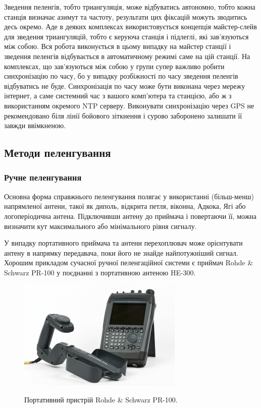 \documentclass{article}
\begin{document}
Зведення пеленгів, тобто триангуляція, може відбуватись автономно, тобто кожна станція визначає азимут та частоту, результати цих фіксацій можуть зводитись десь окремо. Аде в деяких комплексах використовується концепція майстер-слейв для зведення триангуляцій, тобто є керуюча станція і підлеглі, які зав'язуються між собою. Вся робота виконується в цьому випадку на майстер станції і зведення пеленгів відбувається в автоматичному режимі саме на цій станції. На комплексах, що зав'язуються між собою у групи супер важливо робити синхронізацію по часу, бо у випадку розбіжності по часу зведення пеленгів відбуватись не буде. Синхронізація по часу може бути виконана через мережу інтернет, а саме системний час з вашого комп'ютера та станцією, або ж з використанням окремого NTP серверу. Виконувати синхронізацію через GPS не рекомендовано біля лінії бойового зіткнення і сурово заборонено залишати її завжди ввімкненою.


\subsection{Методи пеленгування}
 
\subsubsection{Ручне пеленгування}
Основна форма справжнього пеленгування полягає у використанні (більш-менш) напрямленої антени, такої як диполь, відкрита петля, віконна, Адкока, Ягі або логоперіодична антена. Підключивши антену до приймача і повертаючи її, можна визначити кут максимального або мінімального рівня сигналу.

У випадку портативного приймача та антени перехоплювач може орієнтувати антену в напрямку передавача, поки його не знайде найпотужніший сигнал. Хорошим прикладом сучасної ручної пеленгаційної системи є приймач Rohde \& Schwarz PR-100 у поєднанні з портативною антеною HE-300. 

\begin{figure}[H]
\centering
{\includegraphics[width=0.6\linewidth]{images/rds-rs-100.jpg}}
\caption{\label{fig:rds:pr100}Портативний пристрій Rohde \& Schwarz PR-100.}
\end{figure}
\end{document}

